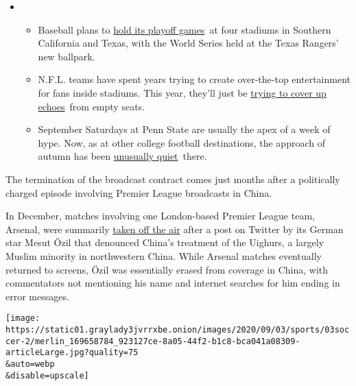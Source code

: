 \begin{itemize}
\item
  \begin{itemize}
  \tightlist
  \item
    Baseball plans to
    \href{https://www.nytimes3xbfgragh.onion/2020/09/10/sports/baseball/mlb-postseason-neutral-sites.html?action=click\&pgtype=Article\&state=default\&region=MAIN_CONTENT_2\&context=storylines_keepup}{hold
    its playoff games}~at four stadiums in Southern California and
    Texas, with the World Series held at the Texas Rangers' new
    ballpark.
  \item
    N.F.L. teams have spent years trying to create over-the-top
    entertainment for fans inside stadiums. This year, they'll just be
    \href{https://www.nytimes3xbfgragh.onion/2020/09/10/sports/football/what-will-nfl-games-sound-like.html?action=click\&pgtype=Article\&state=default\&region=MAIN_CONTENT_2\&context=storylines_keepup}{trying
    to cover up echoes}~from empty seats.
  \item
    September Saturdays at Penn State are usually the apex of a week of
    hype. Now, as at other college football destinations, the approach
    of autumn has been
    \href{https://www.nytimes3xbfgragh.onion/2020/09/09/sports/penn-state-college-football-canceled.html?action=click\&pgtype=Article\&state=default\&region=MAIN_CONTENT_2\&context=storylines_keepup}{unusually
    quiet}~there.
  \end{itemize}
\end{itemize}

The termination of the broadcast contract comes just months after a
politically charged episode involving Premier League broadcasts in
China.

In December, matches involving one London-based Premier League team,
Arsenal, were summarily
\href{https://www.nytimes3xbfgragh.onion/2019/12/15/world/asia/mesut-ozil-muslims.html}{taken
off the air} after a post on Twitter by its German star Mesut Özil that
denounced China's treatment of the Uighurs, a largely Muslim minority in
northwestern China. While Arsenal matches eventually returned to
screens, Özil was essentially erased from coverage in China, with
commentators not mentioning his name and internet searches for him
ending in error messages.

\texttt{[image: https://static01.graylady3jvrrxbe.onion/images/2020/09/03/sports/03soccer-2/merlin\_169658784\_923127ce-8a05-44f2-b1c8-bca041a08309-articleLarge.jpg?quality=75\\\&auto=webp\\\&disable=upscale]}

